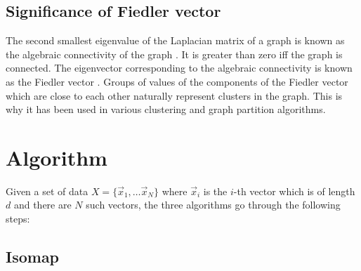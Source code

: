\documentclass[a4paper, 11pt]{article}
\begin{document}
\subsection{Significance of Fiedler vector} \label{sec:fiedler}
The second smallest eigenvalue of the Laplacian matrix of a graph is known as the algebraic connectivity of the graph \cite{Fiedler1973}. It is greater than zero iff the graph is connected. The eigenvector corresponding to the algebraic connectivity is known as the Fiedler vector \cite{Fiedler1975}.  Groups of values of the components of the Fiedler vector which are close to each other naturally represent clusters in the graph. This is why it has been used in various clustering and graph partition algorithms.


\section{Algorithm}
Given a set of data $X = \{\vec{x}_1, \dots \vec{x}_N\}$ where $\vec{x}_i$ is the $i$-th vector which is of length $d$ and there are $N$ such vectors, the three algorithms go through the following steps:

\subsection{Isomap} \label{sec:isomap}
\end{document}
